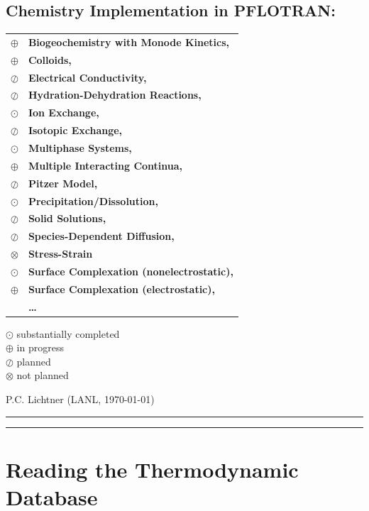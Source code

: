 \documentclass[12pt]{article}
\newcommand{\bcr}{\begin{center}}
\newcommand{\ecr}{\end{center}}
\newcommand{\longline}{\noindent\rule[-0.1in]{\textwidth}{0.01in}}
\begin{document}
\bcr

\section*{Chemistry Implementation in PFLOTRAN:}
\begin{tabular}{ll}
$\oplus$ & \bf\large Biogeochemistry with Monode Kinetics, \\
$\oplus$ & \bf\large Colloids,\\ 
$\oslash$&\bf\large Electrical Conductivity, \\
$\oslash$&\bf\large Hydration-Dehydration Reactions, \\
$\odot$ & \bf\large Ion Exchange, \\
$\oslash$&\bf\large Isotopic Exchange, \\
$\odot$ & \bf\large Multiphase Systems, \\
$\oplus$ & \bf\large Multiple Interacting Continua, \\
$\oslash$& \bf\large Pitzer Model, \\
$\odot$ & \bf\large Precipitation/Dissolution, \\
$\oslash$& \bf\large Solid Solutions, \\
$\oslash$& \bf\large Species-Dependent Diffusion, \\
$\otimes$ & \bf\large Stress-Strain\\
$\odot$ & \bf\large Surface Complexation (nonelectrostatic), \\
$\oplus$ & \bf\large Surface Complexation (electrostatic), \\
&\bf\large \ldots
\end{tabular}

\hfill $\odot$ substantially completed\\
\hfill $\oplus$ in progress\\
\hfill $\oslash$ planned\\
\hfill $\otimes$ not planned

P.C. Lichtner (LANL, \today)

\ecr

\longline

\tableofcontents

\longline

\section{Reading the Thermodynamic Database}

\setcounter{equation}{0}
\end{document}
